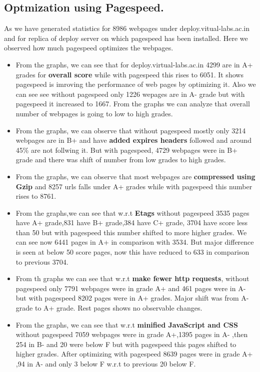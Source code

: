 \documentclass[conference]{IEEEtran}
\begin{document}
\subsection{Optmization using Pagespeed.}\label{sec-6.2}

As we have generated statistics for 8986 webpages under
deploy.vitual-labs.ac.in and for replica of deploy server on which pagespeed has
been installed. Here we observed how much pagespeed optimizes the webpages.
\begin{itemize}
\item From the graphs, we can see that for deploy.virtual-labs.ac.in 4299 are in
A+ grades for \textbf{overall score} while with pagespeed this rises to 6051. It
shows pagespeed is imroving the performance of web pages by optimizing it. Also
we can see see without pagespeed only 1226 wepages are in A- grade but with
pagespeed it increased to 1667. From the graphs we can analyze that overall
number of webpages is going to low to high grades.
\item From the graphs, we can observe that without pagespeed  mostly only 3214
webpages are in B+  and have \textbf{added expires headers} followed  and around
45\% are not follwing it. But with pagespeed, 4729 webpages were in B+ grade and
there was shift of number from low grades to high grades.
\item From the graphs, we can observe that most webpages are \textbf{compressed
using Gzip} and 8257 urls falls under A+ grades while with pagespeed this number
rises to 8761.
\item From the graphs,we can see that w.r.t \textbf{Etags} without pagespeed
3535 pages have A+ grade,831 have B+ grade,384 have C+ grade, 3704 have score
less than 50 but with pagespeed this number shifted to more higher grades. We can
see now 6441 pages in A+  in comparison with 3534. But major difference is seen
at below 50 score pages, now this have reduced to 633 in comparison to previous
3704.
\item From th graphs we can see that w.r.t \textbf{make fewer http
requests}, without pagespeed only 7791 webpages were in grade A+ and 461 pages
were in A- but with pagespeed 8202 pages were in A+ grades. Major shift was from 
A- grade to A+ grade. Rest pages shows no observable changes.
\item From the graphs, we can see that w.r.t \textbf{minified JavaScript and CSS}
without pagespeed 7059 webpages were in grade A+,1395 pages in A- ,then 254 in
B- and 20 were below F but with pagespeed this pages shifted to higher
grades. After optimizing with pagespeed 8639 pages were in grade A+ ,94 in A- and only 3 below F w.r.t to
previous 20 below F.
\end{itemize}
\end{document}
